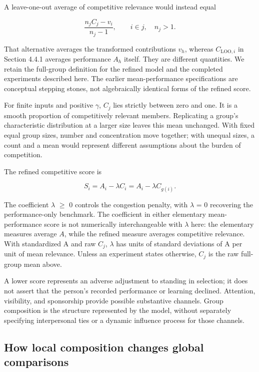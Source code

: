 A leave-one-out average of competitive relevance would instead equal

\[
\frac{n_jC_j-v_i}{n_j-1},\qquad i\in j,\quad n_j>1.
\]

That alternative averages the transformed contributions \(v_h\), whereas \(C_{\mathrm{LOO},i}\) in Section 4.4.1 averages performance \(A_h\) itself. They are different quantities. We retain the full-group definition for the refined model and the completed experiments described here. The earlier mean-performance specifications are conceptual stepping stones, not algebraically identical forms of the refined score.

For finite inputs and positive \(\gamma\), \(C_{j}\) lies strictly between zero and one. It is a smooth proportion of competitively relevant members. Replicating a group's characteristic distribution at a larger size leaves this mean unchanged. With fixed equal group sizes, number and concentration move together; with unequal sizes, a count and a mean would represent different assumptions about the burden of competition.

The refined competitive score is

\[
S_i=A_i-\lambda C_i=A_i-\lambda C_{g(i)}.
\]

The coefficient \(\lambda\) \ensuremath{\geq} 0 controls the congestion penalty, with \(\lambda\) = 0 recovering the performance-only benchmark. The coefficient in either elementary mean-performance score is not numerically interchangeable with \(\lambda\) here: the elementary measures average \(A\), while the refined measure averages competitive relevance. With standardized A and raw \(C_{j}\), \(\lambda\) has units of standard deviations of A per unit of mean relevance. Unless an experiment states otherwise, \(C_{j}\) is the raw full-group mean above.

A lower score represents an adverse adjustment to standing in selection; it does not assert that the person's recorded performance or learning declined. Attention, visibility, and sponsorship provide possible substantive channels. Group composition is the structure represented by the model, without separately specifying interpersonal ties or a dynamic influence process for those channels.

\subsection{How local composition changes global comparisons}\label{how-local-composition-changes-global-comparisons}

